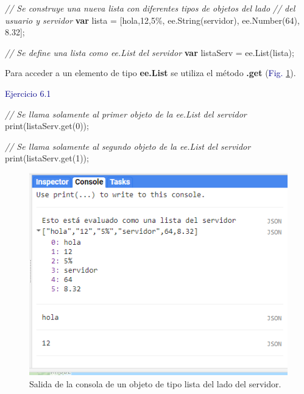 \documentclass[
  12pt,
  letterpaper,
  twoside]{book}
\newenvironment{Shaded}{\begin{snugshade}}{\end{snugshade}}
\newcommand{\CommentTok}[1]{\textcolor[rgb]{0.24,0.58,0.00}{\textit{#1}}}
\newcommand{\ControlFlowTok}[1]{\textcolor[rgb]{0.00,0.00,0.00}{\textbf{#1}}}
\newcommand{\DecValTok}[1]{\textcolor[rgb]{0.28,0.53,0.93}{#1}}
\newcommand{\FloatTok}[1]{\textcolor[rgb]{0.28,0.53,0.93}{#1}}
\newcommand{\FunctionTok}[1]{\textcolor[rgb]{0.48,0.12,0.64}{#1}}
\newcommand{\KeywordTok}[1]{\textcolor[rgb]{0.48,0.12,0.64}{#1}}
\newcommand{\NormalTok}[1]{#1}
\newcommand{\OperatorTok}[1]{\textcolor[rgb]{0.00,0.00,0.00}{#1}}
\newcommand{\StringTok}[1]{\textcolor[rgb]{0.87,0.29,0.22}{#1}}
\newcommand\boldpurple[1]{\textcolor{darkpurple}{\textbf{#1}}}
\begin{document}
\begin{Shaded}
\begin{Highlighting}[]
\CommentTok{// Se construye una nueva lista con diferentes tipos de objetos del lado }
\CommentTok{// del usuario y servidor}
\ControlFlowTok{var}\NormalTok{ lista }\OperatorTok{=}\NormalTok{ [}\StringTok{\textquotesingle{}hola\textquotesingle{}}\OperatorTok{,}\StringTok{\textquotesingle{}12\textquotesingle{}}\OperatorTok{,}\StringTok{\textquotesingle{}5\%\textquotesingle{}}\OperatorTok{,} \KeywordTok{ee}\OperatorTok{.}\FunctionTok{String}\NormalTok{(}\StringTok{\textquotesingle{}servidor\textquotesingle{}}\NormalTok{)}\OperatorTok{,} \KeywordTok{ee}\OperatorTok{.}\FunctionTok{Number}\NormalTok{(}\DecValTok{64}\NormalTok{)}\OperatorTok{,} \FloatTok{8.32}\NormalTok{]}\OperatorTok{;}

\CommentTok{// Se define una lista como ee.List del servidor }
\ControlFlowTok{var}\NormalTok{ listaServ }\OperatorTok{=} \KeywordTok{ee}\OperatorTok{.}\FunctionTok{List}\NormalTok{(lista)}\OperatorTok{;}             
\end{Highlighting}
\end{Shaded}

Para acceder a un elemento de tipo \boldpurple{ee.List} se utiliza el método \boldpurple{.get} (\textcolor{darkblue}{Fig.} \ref{fig:f59}).

\textcolor{darkblue}{Ejercicio 6.1}

\begin{Shaded}
\begin{Highlighting}[]
\CommentTok{// Se llama solamente al primer objeto de la ee.List del servidor}
\FunctionTok{print}\NormalTok{(listaServ}\OperatorTok{.}\FunctionTok{get}\NormalTok{(}\DecValTok{0}\NormalTok{))}\OperatorTok{;}   

\CommentTok{// Se llama solamente al segundo objeto de la ee.List del servidor}
\FunctionTok{print}\NormalTok{(listaServ}\OperatorTok{.}\FunctionTok{get}\NormalTok{(}\DecValTok{1}\NormalTok{))}\OperatorTok{;} 
\end{Highlighting}
\end{Shaded}

\begin{figure}[H]

{\centering \includegraphics[width=0.7\linewidth]{Img/ej6} 

}

\caption{Salida de la consola de un objeto de tipo lista del lado del servidor.}\label{fig:f59}
\end{figure}
\end{document}
